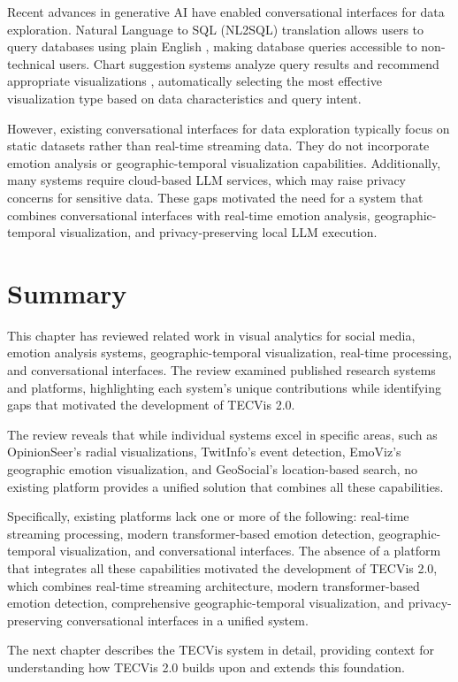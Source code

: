 Recent advances in generative AI have enabled conversational interfaces for data exploration. Natural Language to SQL (NL2SQL) translation allows users to query databases using plain English \cite{zhong2017seq2sql}, making database queries accessible to non-technical users. Chart suggestion systems analyze query results and recommend appropriate visualizations \cite{mackinlay2007show}, automatically selecting the most effective visualization type based on data characteristics and query intent.

However, existing conversational interfaces for data exploration typically focus on static datasets rather than real-time streaming data. They do not incorporate emotion analysis or geographic-temporal visualization capabilities. Additionally, many systems require cloud-based LLM services, which may raise privacy concerns for sensitive data. These gaps motivated the need for a system that combines conversational interfaces with real-time emotion analysis, geographic-temporal visualization, and privacy-preserving local LLM execution.


\section{Summary}

This chapter has reviewed related work in visual analytics for social media, emotion analysis systems, geographic-temporal visualization, real-time processing, and conversational interfaces. The review examined published research systems and platforms, highlighting each system's unique contributions while identifying gaps that motivated the development of TECVis 2.0.

The review reveals that while individual systems excel in specific areas, such as OpinionSeer's radial visualizations, TwitInfo's event detection, EmoViz's geographic emotion visualization, and GeoSocial's location-based search, no existing platform provides a unified solution that combines all these capabilities.

Specifically, existing platforms lack one or more of the following: real-time streaming processing, modern transformer-based emotion detection, geographic-temporal visualization, and conversational interfaces. The absence of a platform that integrates all these capabilities motivated the development of TECVis 2.0, which combines real-time streaming architecture, modern transformer-based emotion detection, comprehensive geographic-temporal visualization, and privacy-preserving conversational interfaces in a unified system.

The next chapter describes the TECVis system in detail, providing context for understanding how TECVis 2.0 builds upon and extends this foundation.

